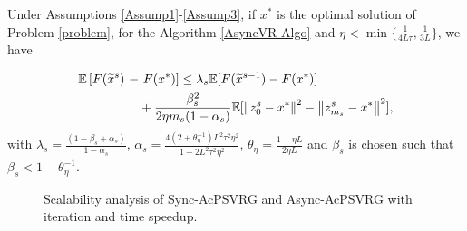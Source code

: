 \begin{lemma}\label{lemma1}
Under Assumptions \ref{Assump1}-\ref{Assump3}, if $x^*$ is the optimal solution of Problem \eqref{problem}, for the Algorithm \ref{AsyncVR-Algo} and $\eta < \min\{\frac{1}{4L
\tau}, \frac{1}{3L}\}$, we have 

\begin{equation}
\begin{split}
\mathbb{E}\left[ F(\widetilde{x}^s)\right. &-\left. F(x^*)\right]
\leq \lambda_s\mathbb{E}[F(\widetilde{x}^{s-1}) - F(x^*)]\\
&~~~+{\frac{\beta_s^2}{2\eta m_s(1-\alpha_s)}}\mathbb{E}[\left\lVert z_{0}^s-x^*\right\rVert^2-\left\lVert z_{m_s}^s-x^*\right\rVert^2 ],
\end{split}
\end{equation}
with $\lambda_s = \frac{(1-\beta_s+\alpha_s)}{1-\alpha_s}$, $\alpha_s=\frac{4(2+\theta_{\eta}^{-1})L^2\tau^2\eta^2}{1-2L^2 \tau^2\eta^2}$, $\theta_{\eta} = \frac{1-\eta L}{2\eta L}$ and $\beta_s$ is chosen such that $\beta_s < 1-\theta_{\eta}^{-1}$.
\end{lemma}
\begin{figure}[htbp]
%
%
%
%
\setlength{\abovecaptionskip}{2pt}
\caption{Scalability analysis of Sync-AcPSVRG and Async-AcPSVRG with iteration and time speedup. }
\label{fig:FSVRG_speedup}
\end{figure}

